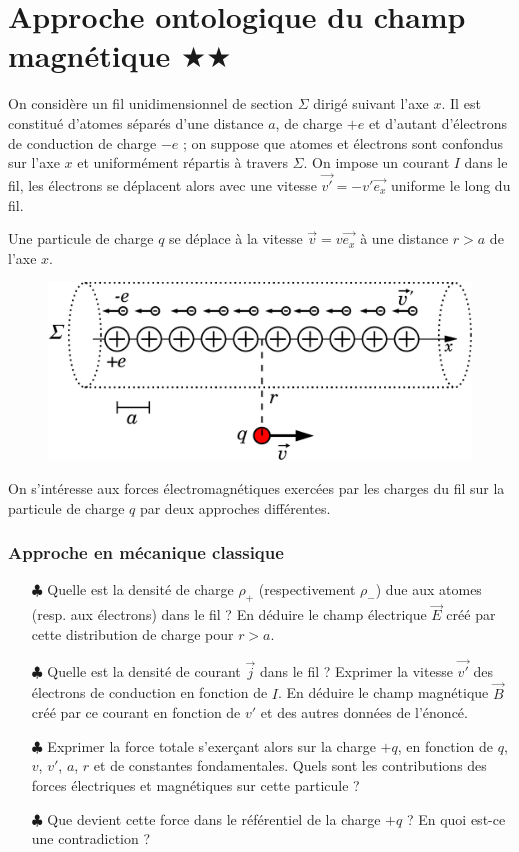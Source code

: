 \documentclass{report}
\begin{document}
\newpage

\section*{Approche ontologique du champ magnétique $\bigstar\bigstar$}

On considère un fil unidimensionnel de section $\Sigma$ dirigé suivant l'axe $x$. Il est constitué d'atomes séparés d'une distance $a$, de charge $+e$  et d'autant d'électrons de conduction de charge $-e$ ; on suppose que atomes et électrons sont confondus sur l'axe $x$ et uniformément répartis à travers $\Sigma$. On impose un courant $I$ dans le fil, les électrons se déplacent alors avec une vitesse $\vec{v'}=-v'\vec{e_{x}}$ uniforme le long du fil.

Une particule de charge $q$ se déplace à la vitesse $\vec{v}=v\vec{e_{x}}$ à une distance $r>a$ de l'axe $x$.

\begin{figure}[h!]
\centering
		\includegraphics[scale=0.25]{cable.pdf}
\end{figure}

On s'intéresse aux forces électromagnétiques exercées par les charges du fil sur la particule de charge $q$ par deux approches différentes.

\subsubsection*{Approche en mécanique classique}

\begin{itemize}
	\item[$\clubsuit$] Quelle est la densité de charge $\rho_{+}$ (respectivement $\rho_{-}$) due aux atomes (resp. aux électrons) dans le fil ? En déduire le champ électrique $\vec{E}$ créé par cette distribution de charge pour $r>a$.
	
	\item[$\clubsuit$] Quelle est la densité de courant $\vec{j}$ dans le fil ? Exprimer la vitesse $\vec{v'}$ des électrons de conduction en fonction de $I$. En déduire le champ magnétique $\vec{B}$ créé par ce courant en fonction de $v'$ et des autres données de l'énoncé.
	\item[$\clubsuit$] Exprimer la force totale s'exerçant alors sur la charge $+q$, en fonction de $q$, $v$, $v'$, $a$, $r$ et de constantes fondamentales. Quels sont les contributions des forces électriques et magnétiques sur cette particule ?
	\item[$\clubsuit$] Que devient cette force dans le référentiel de la charge $+q$ ? En quoi est-ce une contradiction ?
\end{itemize}
\end{document}
